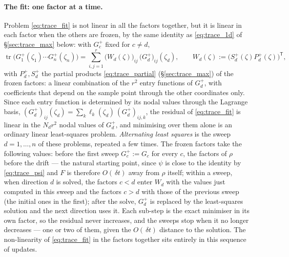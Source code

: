 \documentclass[11pt,a4paper]{article}
\newcommand{\tr}{\operatorname{tr}}
\newcommand{\T}{^{\mathsf T}}
\newcommand{\dt}{\,\delta t}
\theoremstyle{plain}
\theoremstyle{definition}
\theoremstyle{remark}
\begin{document}
\paragraph{The fit: one factor at a time.}
Problem \eqref{eq:trace_fit} is not linear in all the factors together, but it is linear in each factor when the others are frozen, by the same identity as \eqref{eq:trace_1d} of \S\ref{sec:trace_max} below: with $G_c^+$ fixed for $c\ne d$,
\begin{equation}
  \tr\big(G_1^+(\zeta_1)\cdots G_n^+(\zeta_n)\big) = \sum_{i,j=1}^r\big(W_d(\zeta)\big)_{ij}\,\big(G_d^+\big)_{ij}(\zeta_d), \qquad W_d(\zeta) := \big(S_d^+(\zeta)P_d^+(\zeta)\big)\T,
  \label{eq:trace_fit_lin}
\end{equation}
with $P_d^+,S_d^+$ the partial products \eqref{eq:trace_partial} (\S\ref{sec:trace_max}) of the frozen factors: a linear combination of the $r^2$ entry functions of $G_d^+$, with coefficients that depend on the sample point through the other coordinates only. Since each entry function is determined by its nodal values through the Lagrange basis, $(G_d^+)_{ij}(\zeta_d) = \sum_k\ell_k(\zeta_d)\,(G_d^+)_{ij,k}$, the residual of \eqref{eq:trace_fit} is linear in the $N_dr^2$ nodal values of $G_d^+$, and minimising over them alone is an ordinary linear least-squares problem. \emph{Alternating least squares} is the sweep $d=1,\dots,n$ of these problems, repeated a few times. The frozen factors take the following values: before the first sweep $G_c^+:=G_c$ for every $c$, the factors of $\rho$ before the drift --- the natural starting point, since $\psi$ is close to the identity by \eqref{eq:trace_psi} and $F$ is therefore $O(\dt)$ away from $\rho$ itself; within a sweep, when direction $d$ is solved, the factors $c<d$ enter $W_d$ with the values just computed in this sweep and the factors $c>d$ with those of the previous sweep (the initial ones in the first); after the solve, $G_d^+$ is replaced by the least-squares solution and the next direction uses it. Each sub-step is the exact minimiser in its own factor, so the residual never increases, and the sweeps stop when it no longer decreases --- one or two of them, given the $O(\dt)$ distance to the solution. The non-linearity of \eqref{eq:trace_fit} in the factors together sits entirely in this sequence of updates.
\end{document}
